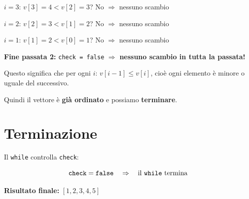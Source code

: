 $i=3$: $v[3]=4 < v[2]=3$? No $\Rightarrow$ nessuno scambio
\begin{center}
\end{center}

$i=2$: $v[2]=3 < v[1]=2$? No $\Rightarrow$ nessuno scambio
\begin{center}
\end{center}

$i=1$: $v[1]=2 < v[0]=1$? No $\Rightarrow$ nessuno scambio
\begin{center}
\end{center}

\textbf{Fine passata 2:} \texttt{check = false} $\Rightarrow$ \textbf{nessuno scambio in tutta la passata!}

\bigskip
Questo significa che per ogni $i$: $v[i-1] \leq v[i]$, cio\`e ogni elemento \`e minore o uguale del successivo.

Quindi il vettore \`e \textbf{gi\`a ordinato} e possiamo \textbf{terminare}.

\begin{center}
\end{center}

\section*{Terminazione}

Il \texttt{while} controlla \texttt{check}:

$$\texttt{check} = \texttt{false} \quad \Rightarrow \quad \text{il \texttt{while} termina}$$

\textbf{Risultato finale:} $[1, 2, 3, 4, 5]$ \checkmark


